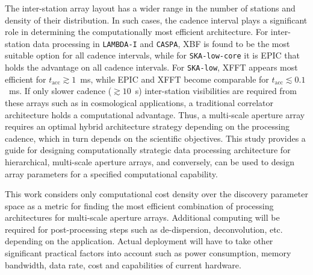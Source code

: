 \documentclass[
  journal=pasa,
  manuscript=article-type,
  year=2020,
  volume=37,
]{cup-journal}
\begin{document}
The inter-station array layout has a wider range in the number of stations and density of their distribution. In such cases, the cadence interval plays a significant role in determining the computationally most efficient architecture. For inter-station data processing in \texttt{LAMBDA-I} and \texttt{CASPA}, XBF is found to be the most suitable option for all cadence intervals, while for \texttt{SKA-low-core} it is EPIC that holds the advantage on all cadence intervals. For \texttt{SKA-low}, XFFT appears most efficient for $t_\textrm{acc}\gtrsim 1$~ms, while EPIC and XFFT become comparable for $t_\textrm{acc}\lesssim 0.1$~ms. If only slower cadence ($\gtrsim 10$~s) inter-station visibilities are required from these arrays such as in cosmological applications, a traditional correlator architecture holds a computational advantage. Thus, a multi-scale aperture array requires an optimal hybrid architecture strategy depending on the processing cadence, which in turn depends on the scientific objectives. This study provides a guide for designing computationally strategic data processing architecture for hierarchical, multi-scale aperture arrays, and conversely, can be used to design array parameters for a specified computational capability. 

This work considers only computational cost density over the discovery parameter space as a metric for finding the most efficient combination of processing architectures for multi-scale aperture arrays. Additional computing will be required for post-processing steps such as de-dispersion, deconvolution, etc. depending on the application. Actual deployment will have to take other significant practical factors into account such as power consumption, memory bandwidth, data rate, cost and capabilities of current hardware.


\end{document}
